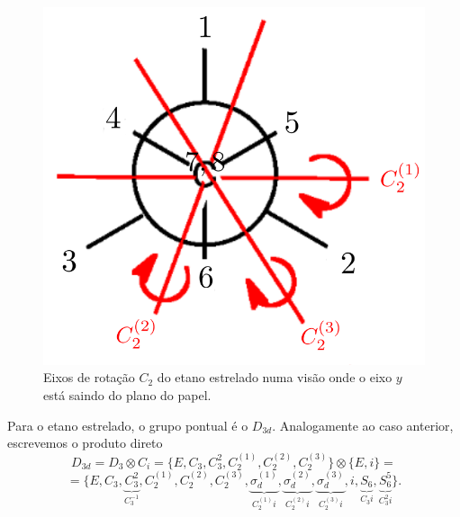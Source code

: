 \documentclass[a4paper,10pt]{article}
\begin{document}
\begin{figure}[H]
\centering
\includegraphics[width=0.3\linewidth]{fig/C2_estrelado.png}
\caption{Eixos de rotação $C_2$ do etano estrelado numa visão onde o eixo $y$ está saindo do plano do papel.}
\label{fig:C2_estrelado}
\end{figure}


Para o etano estrelado, o grupo pontual é o $D_{3d}$. Analogamente ao caso anterior, escrevemos o produto direto
\begin{equation} \label{eq:D3d-direct}
D_{3d} = D_3 \otimes C_{i} =
\{E, C_3, C_3^2, C_2^{(1)}, C_2^{(2)}, C_2^{(3)}\} \otimes \{E, i\} =
\end{equation}
$$
=
\{E, C_3, \underbrace{C_3^2}_{C_3^{-1}}, C_2^{(1)}, C_2^{(2)}, C_2^{(3)},
\underbrace{\sigma_d^{(1)}}_{C_2^{(1)} i},
\underbrace{\sigma_d^{(2)}}_{C_2^{(2)} i},
\underbrace{\sigma_d^{(3)}}_{C_2^{(3)} i},
i,
\underbrace{S_6}_{C_3 i},
\underbrace{S_6^5}_{C_3^2 i}\}.
$$
\end{document}
